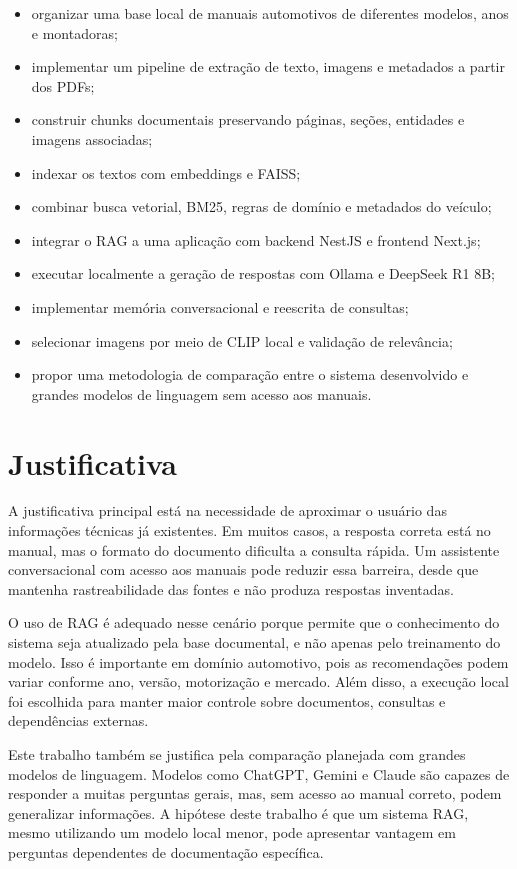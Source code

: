 \begin{itemize}
  \item organizar uma base local de manuais automotivos de diferentes modelos, anos e montadoras;
  \item implementar um pipeline de extração de texto, imagens e metadados a partir dos PDFs;
  \item construir chunks documentais preservando páginas, seções, entidades e imagens associadas;
  \item indexar os textos com embeddings e FAISS;
  \item combinar busca vetorial, BM25, regras de domínio e metadados do veículo;
  \item integrar o RAG a uma aplicação com backend NestJS e frontend Next.js;
  \item executar localmente a geração de respostas com Ollama e DeepSeek R1 8B;
  \item implementar memória conversacional e reescrita de consultas;
  \item selecionar imagens por meio de CLIP local e validação de relevância;
  \item propor uma metodologia de comparação entre o sistema desenvolvido e grandes modelos de linguagem sem acesso aos manuais.
\end{itemize}

\section{Justificativa}
\label{sec:justificativa}

A justificativa principal está na necessidade de aproximar o usuário das informações técnicas já existentes. Em muitos casos, a resposta correta está no manual, mas o formato do documento dificulta a consulta rápida. Um assistente conversacional com acesso aos manuais pode reduzir essa barreira, desde que mantenha rastreabilidade das fontes e não produza respostas inventadas.

O uso de RAG é adequado nesse cenário porque permite que o conhecimento do sistema seja atualizado pela base documental, e não apenas pelo treinamento do modelo. Isso é importante em domínio automotivo, pois as recomendações podem variar conforme ano, versão, motorização e mercado. Além disso, a execução local foi escolhida para manter maior controle sobre documentos, consultas e dependências externas.

Este trabalho também se justifica pela comparação planejada com grandes modelos de linguagem. Modelos como ChatGPT, Gemini e Claude são capazes de responder a muitas perguntas gerais, mas, sem acesso ao manual correto, podem generalizar informações. A hipótese deste trabalho é que um sistema RAG, mesmo utilizando um modelo local menor, pode apresentar vantagem em perguntas dependentes de documentação específica.

